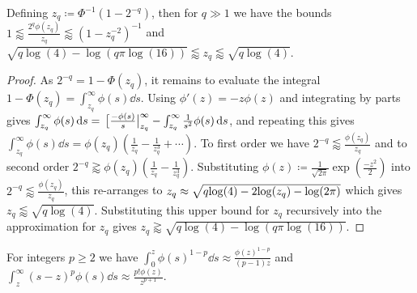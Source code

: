\documentclass[manuscript,review]{acmart}
\begin{document}
\begin{lemma}
\label{lemma:approximate_tail_values}
Defining $ z_q \coloneqq \Phi^{-1}(1 - 2^{-q})$, then for $ q \gg 1 $ we have the bounds $ 1 \lessapprox \tfrac{2^q\phi(z_q)}{z_q} \lessapprox (1 - z_q^{-2})^{-1}$  and $ \sqrt{q \log(4) - \log(q \pi \log(16))} \lessapprox z_q  \lessapprox \sqrt{q \log(4)}$.
\end{lemma}

\begin{proof}
As $ 2^{-q} = 1 - \Phi(z_q) $, it remains to evaluate the integral $ 1 - \Phi(z_q) = \int_{z_q}^{\infty} \phi(s) \dd{s} $. Using $ \phi'(z) =  -z \phi(z) $ and integrating by parts gives $ \int_{z_q}^{\infty} \phi(s) \dd{s} = \eval*[\tfrac{-\phi(s)}{s}|_{z_q}^{\infty} - \int_{z_q}^{\infty} \tfrac{1}{s^2} \phi(s) \dd{s} $, and repeating this gives $ \int_{z_q}^{\infty} \phi(s) \dd{s}  = \phi(z_q)(\tfrac{1}{z_q} - \tfrac{1}{z_q^3} + \cdots) $. To first order we have $ 2^{-q} \lessapprox \tfrac{\phi(z_q)}{z_q} $ and to second order $ 2^{-q} \gtrapprox \phi(z_q)(\tfrac{1}{z_q} - \tfrac{1}{z_q^3}) $.  Substituting $ \phi(z) \coloneqq \tfrac{1}{\sqrt{2 \pi}} {\exp}(\tfrac{-z^2}{2}) $ into $ 2^{-q} \lessapprox \tfrac{\phi(z_q)}{z_q} $, this re-arranges to $ z_q \approx \sqrt{q{\log}(4) - 2{\log}(\smash{z_q}) - {\log}(2\pi)} $ which gives $ z_q \lessapprox \sqrt{q \log(4)} $. Substituting this upper bound for $ z_q $ recursively into the approximation  for $ z_q $ gives $ z_q \gtrapprox  \sqrt{q \log(4) - \log(q \pi \log(16))}$. \qedhere
\end{proof}

\begin{lemma}
\label{lemma:approximate_moments}
For integers $ p \geq 2 $ we have $ \int_{0}^{z} \phi(s)^{1-p} \dd{s} \approx \tfrac{\phi(z)^{1-p}}{(p-1)z}  $ and $ \int_{z}^{\infty} (s-z)^p\phi(s) \dd{s} \approx \tfrac{p!\phi(z)}{z^{p+1}} $.
\end{lemma}
\end{document}
